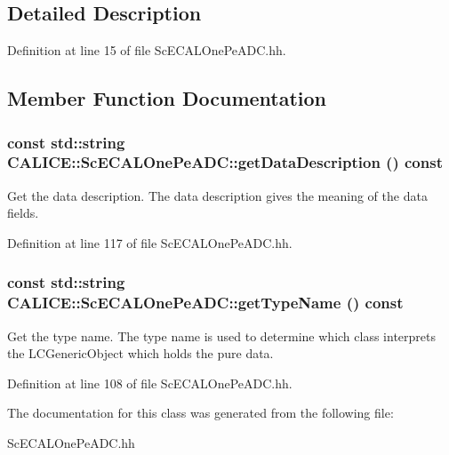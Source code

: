 \subsection{Detailed Description}


Definition at line 15 of file ScECALOnePeADC.hh.

\subsection{Member Function Documentation}
\subsubsection[{getDataDescription}]{\setlength{\rightskip}{0pt plus 5cm}const std::string CALICE::ScECALOnePeADC::getDataDescription () const\hspace{0.3cm}{\ttfamily  [inline]}}\label{classCALICE_1_1ScECALOnePeADC_a1b9d115ea651bf12de87a6279623a310}


Get the data description. The data description gives the meaning of the data fields. 

Definition at line 117 of file ScECALOnePeADC.hh.
\subsubsection[{getTypeName}]{\setlength{\rightskip}{0pt plus 5cm}const std::string CALICE::ScECALOnePeADC::getTypeName () const\hspace{0.3cm}{\ttfamily  [inline]}}\label{classCALICE_1_1ScECALOnePeADC_a287640791f27b58dd41bbf10084c1b82}


Get the type name. The type name is used to determine which class interprets the LCGenericObject which holds the pure data. 

Definition at line 108 of file ScECALOnePeADC.hh.

The documentation for this class was generated from the following file:\begin{DoxyCompactItemize}
\item 
ScECALOnePeADC.hh\end{DoxyCompactItemize}
